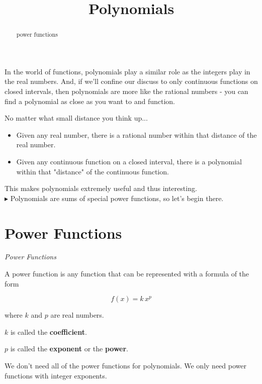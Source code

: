 \documentclass{ximera}
\title{Polynomials}
\begin{document}
\begin{abstract}
power functions
\end{abstract}
\maketitle


In the world of functions, polynomials play a similar role as the integers play in the real numbers. And, if we'll confine our discuss to only continuous functions on closed intervals, then polynomials are more like the rational numbers - you can find a polynomial as close as you want to and function.


No matter what small distance you think up...

\begin{itemize}
\item Given any real number, there is a rational number within that distance of the real number.

\item Given any continuous function on a closed interval, there is a polynomial within that "distance" of the continuous function.
\end{itemize}

This makes polynomials extremely useful and thus interesting. \\


$\blacktriangleright$ Polynomials are sums of special power functions, so let's begin there.













\section{Power Functions}

\begin{definition} \textit{Power Functions}

A power function is any function that can be represented with a formula of the form

\[   f(x) = k \, x^p      \]

where $k$ and $p$ are real numbers.

$k$ is called the \textbf{coefficient}.

$p$ is called the \textbf{exponent} or the \textbf{power}.


\end{definition}
We don't need all of the power functions for polynomials.  We only need power functions with integer exponents. \\
\end{document}
